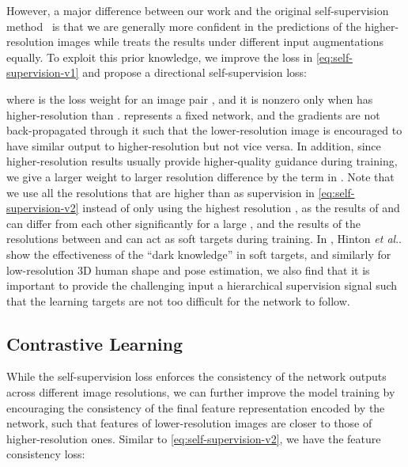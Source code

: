 \documentclass[runningheads]{llncs}
\makeatletter
\DeclareRobustCommand\onedot{\futurelet\@let@token\@onedot}
\def\@onedot{\ifx\@let@token.\else.\null\fi\xspace}
\def\etal{\emph{et al}\onedot}
\makeatother
\begin{document}
However, a major difference between our work and the original self-supervision method~\cite{laine2017temporal} is that we are generally more confident in the predictions of the higher-resolution images while \cite{laine2017temporal} treats the results under different input augmentations equally.
To exploit this prior knowledge, we improve the loss in \eqref{eq:self-supervision-v1} and propose a directional self-supervision loss:

where  is the loss weight for an image pair , and it is nonzero only when  has higher-resolution than .
 represents a fixed network, and the gradients are not back-propagated through it such that the lower-resolution image  is encouraged to have similar output to higher-resolution  but not vice versa.
In addition, since higher-resolution results usually provide higher-quality guidance during training, we give a larger weight to larger resolution difference by the term  in .
Note that we use all the resolutions that are higher than  as supervision in \eqref{eq:self-supervision-v2} instead of only using the highest resolution , as the results of  and  can differ from each other significantly for a large , and the results of the resolutions between  and  can act as soft targets during training. In \cite{hinton2015distilling}, Hinton \etal show the effectiveness of the ``dark knowledge'' in soft targets, and similarly for low-resolution 3D human shape and pose estimation, we also find that it is important to provide the challenging input a hierarchical supervision signal such that the learning targets are not too difficult for the network to follow. 






\subsection{Contrastive Learning}
While the self-supervision loss enforces the consistency of the network outputs across different image resolutions, we can further improve the model training by encouraging the consistency of the final feature representation  encoded by the network, such that features of lower-resolution images are closer to those of higher-resolution ones.
Similar to \eqref{eq:self-supervision-v2}, we have the feature consistency loss:
\end{document}
